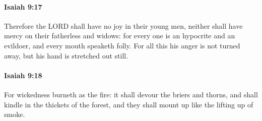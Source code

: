 		\paragraph{Isaiah 9:17} %
			\label{ISAIAH-9-17}

			Therefore the LORD shall have no joy in their young men, neither shall have mercy on their fatherless and widows: for every one is an hypocrite and an evildoer, and every mouth speaketh folly. For all this his anger is not turned away, but his hand is stretched out still.


		\paragraph{Isaiah 9:18} %
			\label{ISAIAH-9-18}

			For wickedness burneth as the fire: it shall devour the briers and thorns, and shall kindle in the thickets of the forest, and they shall mount up like the lifting up of smoke.

